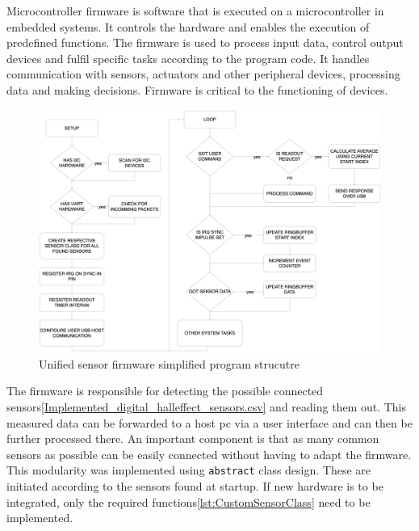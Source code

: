 Microcontroller firmware is software that is executed on a
microcontroller in embedded systems. It controls the hardware and
enables the execution of predefined functions. The firmware is used to
process input data, control output devices and fulfil specific tasks
according to the program code. It handles communication with sensors,
actuators and other peripheral devices, processing data and making
decisions. Firmware is critical to the functioning of devices.

\begin{figure}
\centering
\includegraphics{./generated_images/border_Unified_sensor_firmware_simplified_program_strucutre.png}
\caption{Unified sensor firmware simplified program strucutre
\label{Unified_sensor_firmware_simplified_program_strucutre.png}}
\end{figure}

The firmware is responsible for detecting the possible connected
sensors\ref{Implemented_digital_halleffect_sensors.csv} and reading them
out. This measured data can be forwarded to a host \gls{pc} via a user
interface and can then be further processed there. An important
component is that as many common sensors as possible can be easily
connected without having to adapt the firmware. This modularity was
implemented using \passthrough{\lstinline!abstract!} class design. These
are initiated according to the sensors found at startup. If new hardware
is to be integrated, only the required
functions\ref{lst:CustomSensorClass} need to be implemented.

